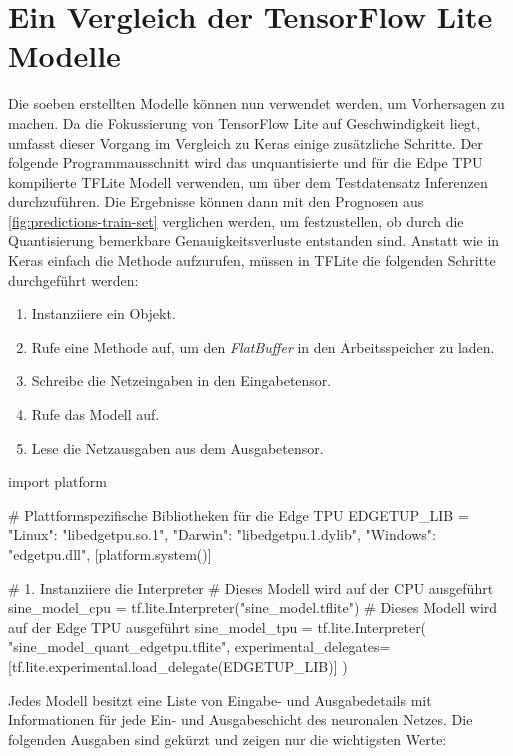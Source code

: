 \section{Ein Vergleich der TensorFlow Lite Modelle}
Die soeben erstellten Modelle können nun verwendet werden, um
Vorhersagen zu machen.
Da die Fokussierung von TensorFlow Lite auf Geschwindigkeit
liegt, umfasst dieser Vorgang im Vergleich zu Keras einige
zusätzliche Schritte. Der folgende Programmausschnitt
wird das unquantisierte und für die Edpe TPU
kompilierte TFLite Modell verwenden, um über dem Testdatensatz Inferenzen
durchzuführen. Die Ergebnisse können dann mit den Prognosen
aus \autoref{fig:predictions-train-set} verglichen werden,
um festzustellen, ob durch die Quantisierung bemerkbare
Genauigkeitsverluste entstanden sind.
Anstatt wie in Keras einfach die 
Methode aufzurufen, müssen in TFLite die folgenden
Schritte durchgeführt werden:
\begin{enumerate}
  \item Instanziiere ein  Objekt.
  \item Rufe eine Methode auf, um den
        \textit{FlatBuffer} in den Arbeitsspeicher zu laden.
  \item Schreibe die Netzeingaben in den Eingabetensor.
  \item Rufe das Modell auf.
  \item Lese die Netzausgaben aus dem Ausgabetensor.
\end{enumerate}
\begin{pythoncode}
import platform

# Plattformspezifische Bibliotheken für die Edge TPU
EDGETUP_LIB = {
    "Linux": "libedgetpu.so.1",
    "Darwin": "libedgetpu.1.dylib",
    "Windows": "edgetpu.dll",
}[platform.system()]

# 1. Instanziiere die Interpreter
# Dieses Modell wird auf der CPU ausgeführt
sine_model_cpu = tf.lite.Interpreter("sine_model.tflite")
# Dieses Modell wird auf der Edge TPU ausgeführt
sine_model_tpu = tf.lite.Interpreter(
    "sine_model_quant_edgetpu.tflite",
    experimental_delegates=[tf.lite.experimental.load_delegate(EDGETUP_LIB)]
)
\end{pythoncode}
Jedes Modell besitzt eine Liste von Eingabe- und Ausgabedetails
mit Informationen für jede Ein- und Ausgabeschicht des neuronalen Netzes.
Die folgenden Ausgaben sind gekürzt und zeigen nur die wichtigsten Werte:
